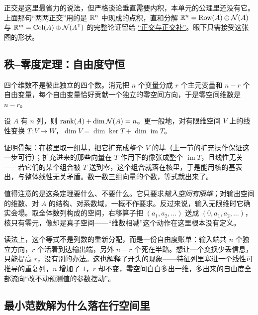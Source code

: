 \begin{remark}
正交是这里最省力的说法，但严格谈论垂直需要内积，本单元的公理里还没有它。上面那句``两两正交''用的是 \(\mathbb{R}^n\) 中现成的点积，直和分解 \(\mathbb{R}^n=\operatorname{Row}(A)\oplus\mathcal N(A)\) 与 \(\mathbb{R}^m=\operatorname{Col}(A)\oplus\mathcal N(A^{\mathsf{T}})\) 的完整论证留给 \hyperref[sec:03-Linear-Algebra/03-Orthogonality/01]{``正交与正交补''}。眼下只需接受这张图的形状。
\end{remark}

\subsection{秩\texorpdfstring{--}{-}零度定理：自由度守恒}

四个维数不是彼此独立的四个数。消元把 \(n\) 个变量分成 \(r\) 个主元变量和 \(n-r\) 个自由变量，每个自由变量恰好贡献一个独立的零空间方向，于是零空间维数是 \(n-r\)。

\begin{theorem}[秩--零度定理]
设 \(A\) 有 \(n\) 列，则 \(\operatorname{rank}(A)+\dim\mathcal N(A)=n\)。更一般地，对有限维空间 \(V\) 上的线性变换 \(T:V\to W\)，\(\dim V=\dim\ker T+\dim\operatorname{im}T\)。
\end{theorem}

证明骨架：在核里取一组基，把它扩充成整个 \(V\) 的基（上一节的扩充操作保证这一步可行）；扩充进来的那些向量在 \(T\) 作用下的像张成整个 \(\operatorname{im}T\)，且线性无关——若它们的某个组合被 \(T\) 送到零，这个组合就落在核里，于是能用核的基表出，与整体线性无关矛盾。数一数三组向量的个数，等式就出来了。

值得注意的是这条定理要什么、不要什么。它只要求\emph{输入空间有限维}；对输出空间的维数、对 \(A\) 的结构、对系数域，一概不作要求。反过来说，输入无限维时它确实会塌。取全体数列构成的空间，右移算子把 \((a_1,a_2,\ldots)\) 送成 \((0,a_1,a_2,\ldots)\)，核只有零元，像却是真子空间——``维数相减''这个动作在这里根本没有定义。

读法上，这个等式不是列数的重新分配，而是一份自由度账单：输入端共 \(n\) 个独立方向，\(r\) 个活着到达输出端，另外 \(n-r\) 个死在半路。想让一个变换少丢信息，只能提高 \(r\)，没有别的办法。这也解释了开头的现象——特征列里塞进一个线性可推导的重复列，\(n\) 增加了 \(1\)，\(r\) 却不变，零空间白白多出一维，多出来的自由度全部流向``改不动预测值的参数摆动''。

\subsection{最小范数解为什么落在行空间里}

